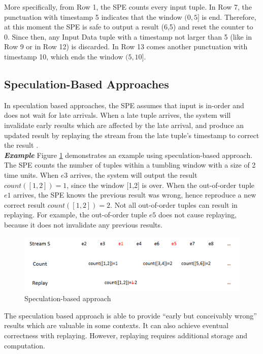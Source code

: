 \documentclass[a4paper, 11pt, twoside]{report}
\begin{document}
More specifically, from Row 1, the SPE counts every input tuple. In Row 7, the punctuation with timestamp 5 indicates that the window $(0,5]$ is end. Therefore, at this moment the SPE is safe to output a result (6,5) and reset the counter to 0. Since then, any Input Data  tuple with a timestamp not larger than 5 (like in Row 9 or in Row 12) is discarded. In Row 13 comes another punctuation with timestamp 10, which ends the window $(5,10]$.

\subsection{Speculation-Based Approaches}
\label{subsec:speculation based approaches}

In speculation based approaches, the SPE assumes that input is in-order and does not wait for late arrivals. When a late tuple arrives, the system will invalidate early results which are affected by the late arrival, and produce an updated result by replaying the stream from the late tuple's timestamp to correct the result \cite{barga2006consistent}.\\

\noindent\textbf{\textit{Example}} Figure \ref{fig:speculation-based-example} demonstrates an example using speculation-based approach. The SPE counts the number of tuples within a tumbling window with a size of 2 time units. When $e3$ arrives, the system will output the result $count([1,2])=1$, since the window [1,2] is over. When the out-of-order tuple $e1$ arrives, the SPE knows the previous result was wrong, hence reproduce a new correct result $count([1,2])=2$. Not all out-of-order tuples can result in replaying. For example, the out-of-order tuple $e5$ does not cause replaying, because it does not invalidate any previous results.\\

\begin{figure}[h]
\centering
\includegraphics[width=5in]{speculation-based}
\caption{Speculation-based approach\label{fig:speculation-based-example}}
\end{figure}

The speculation based approach is able to provide ``early but conceivably wrong'' results which are valuable in some contexts. It can also achieve eventual correctness with replaying. However, replaying requires additional storage and computation.\\
\end{document}
